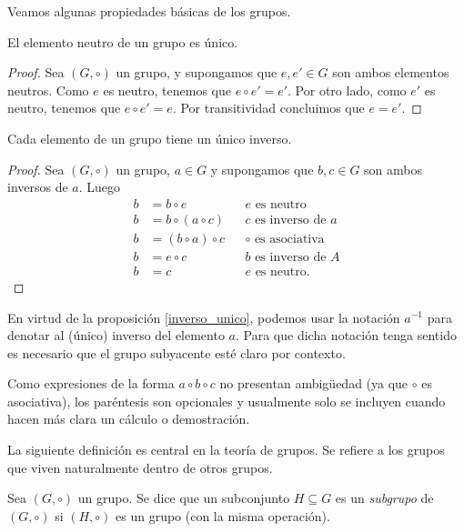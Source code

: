 Veamos algunas propiedades básicas de los grupos.

\begin{proposition}
El elemento neutro de un grupo es único.
\end{proposition}

\begin{proof}
Sea $(G,\circ)$ un grupo, y supongamos que $e, e' \in G$ son ambos elementos neutros. Como $e$ es neutro, tenemos que $e \circ e' = e'$. Por otro lado, como $e'$ es neutro, tenemos que $e \circ e' = e$. Por transitividad concluimos que $e = e'$.
\end{proof}

\begin{proposition} \label{inverso_unico}
	Cada elemento de un grupo tiene un único inverso.
	\end{proposition}
	
	\begin{proof}
	Sea $(G,\circ)$ un grupo, $a \in G$ y supongamos que $b, c \in G$ son ambos inversos de $a$. Luego
	\begin{align*}
	b &= b \circ e && e \text{ es neutro} \\
	b &= b \circ \left( a \circ c \right) && c \text{ es inverso de } a \\
	b &= \left( b \circ a \right) \circ c && \circ \text{ es asociativa} \\
	b &= e \circ c && b \text{ es inverso de } A \\
	b &= c && e \text{ es neutro}.
	\end{align*}
	\end{proof}

En virtud de la proposición \ref{inverso_unico}, podemos usar la notación $a^{-1}$ para denotar al (único) inverso del elemento $a$. Para que dicha notación tenga sentido es necesario que el grupo subyacente esté claro por contexto.

Como expresiones de la forma $a \circ b \circ c$ no presentan ambigüedad (ya que $\circ$ es asociativa), los paréntesis son opcionales y usualmente solo se incluyen cuando hacen más clara un cálculo o demostración.

La siguiente definición es central en la teoría de grupos. Se refiere a los grupos que viven naturalmente dentro de otros grupos.

\begin{definition}
Sea $(G,\circ)$ un grupo. Se dice que un subconjunto $H \subseteq G$ es un \emph{subgrupo} de $(G,\circ)$ si $(H, \circ)$ es un grupo (con la misma operación).
\end{definition}

